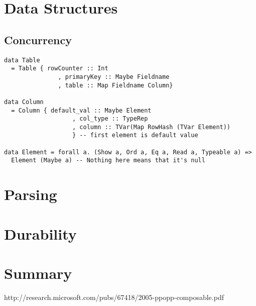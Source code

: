 \documentclass[10.75pt]{article}
\begin{document}
\begin{multicols}{2}
\section{Data Structures}
\setcounter{subsection}{-1} %

\subsection{Concurrency} 
\noindent\begin{minipage}{.45\textwidth}
\begin{lstlisting}[caption=code 1,frame=tlrb, breaklines=true]
data Table 
  = Table { rowCounter :: Int 
               , primaryKey :: Maybe Fieldname 
               , table :: Map Fieldname Column}

data Column 
  = Column { default_val :: Maybe Element
                   , col_type :: TypeRep
                   , column :: TVar(Map RowHash (TVar Element))
                   } -- first element is default value

data Element = forall a. (Show a, Ord a, Eq a, Read a, Typeable a) => 
  Element (Maybe a) -- Nothing here means that it's null
\end{lstlisting}
\end{minipage}\hfill

\section{Parsing}

\section{Durability}

\section{Summary}


\end{multicols}

\begin{thebibliography}{11}

 http://research.microsoft.com/pubs/67418/2005-ppopp-composable.pdf

\end{thebibliography}
\end{document}
